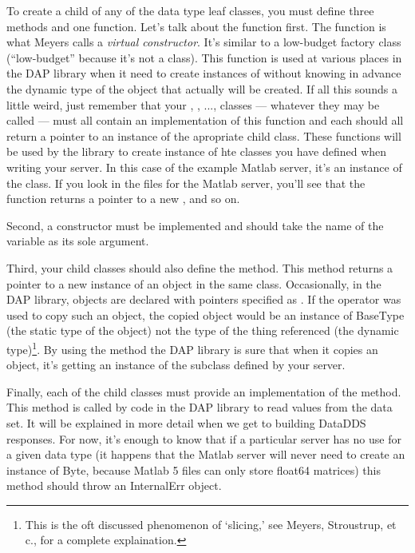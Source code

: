 \documentclass{dods-paper}
\begin{document}
To create a child of any of the data type leaf classes, you must define three
methods and one function. Let's talk about the function first. The function
 is what Meyers\cite{meyers:ecpp} calls a \emph{virtual
constructor}. It's similar to a low-budget factory class (``low-budget''
because it's not a class). This function is used at various places in the DAP
library when it need to create instances of  without knowing in
advance the dynamic type of the object that actually will be created. If all
this sounds a little weird, just remember that your , ,
...,  classes --- whatever they may be called --- must all contain
an implementation of this function and each should all return a pointer to an
instance of the apropriate child class. These functions will be used by the
library to create instance of hte classes you have defined when writing your
server. In this case of the example Matlab server, it's an instance of the
 class. If you look in the files for the Matlab server, you'll
see that the function  returns a pointer to a new ,
and so on.

Second, a constructor must be implemented and should take the name of the
variable as its sole argument.

Third, your child classes should also define the 
method. This method returns a pointer to a new instance of an object in the
same class. Occasionally, in the DAP library, objects are declared with
pointers specified as . If the  operator was used to
copy such an object, the copied object would be an instance of BaseType (the
static type of the object) not the type of the thing referenced (the dynamic
type)\footnote{This is the oft discussed phenomenon of `slicing,' see
Meyers\cite{meyers:ecpp}, Stroustrup\cite{stroustrup:cpp}, et c., for a
complete explaination.}. By using the  method the DAP
library is sure that when it copies an object, it's getting an instance of
the subclass defined by your server.

Finally, each of the child classes must provide an implementation of the
 method. This method is called by code in the DAP library to read
values from the data set. It will be explained in more detail when we get to
building DataDDS responses. For now, it's enough to know that if a particular
server has no use for a given data type (it happens that the Matlab server
will never need to create an instance of Byte, because Matlab 5 files can
only store float64 matrices) this method should throw an InternalErr object.
\end{document}
